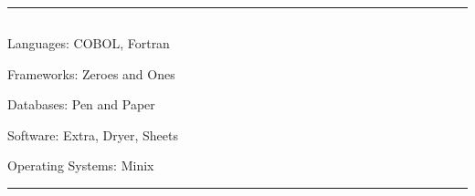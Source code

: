 \documentclass[11pt, letterpaper]{article}
\newenvironment{indentsection}[1]%
{\begin{list}{}%
	{\setlength{\leftmargin}{ #1 } }%
	\item[]%
}
{\end{list}}
\begin{document}
\begin{center}

{\Huge \textsc{  }}

\textbullet
{}\\

\end{center}

\hrule
\vspace{-0.4em}
\subsection*{}

\begin{indentsection}{\parindent}
\begin{description*}
	\item[Languages:]
	COBOL, Fortran\item[Frameworks:]
	Zeroes and Ones\item[Databases:]
	Pen and Paper\item[Software:]
	Extra, Dryer, Sheets\item[Operating Systems:]
	Minix
\end{description*}
\end{indentsection}

\hrule
\vspace{-0.4em}
\subsection*{}
\end{document}

